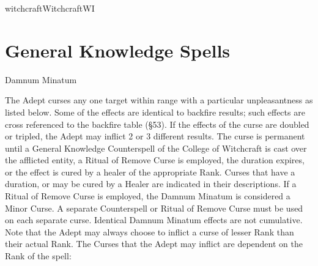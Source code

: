 \begin{College}[1.1]{witchcraft}{Witchcraft}{WI}
\section{General Knowledge Spells}

\begin{spell}[G-1]{Damnum Minatum}

\begin{effects}
The Adept curses any one target within range with a particular
unpleasantness as listed below. Some of the effects are identical to
backfire results; such effects are cross referenced to the backfire
table (§53).  If the effects of the curse are doubled or tripled, the
Adept may inflict 2 or 3 different results.  The curse is permanent
until a General Knowledge Counterspell of the College of Witchcraft is
cast over the afflicted entity, a Ritual of Remove Curse is employed,
the duration expires, or the effect is cured by a healer of the
appropriate Rank. Curses that have a duration, or may be cured by a
Healer are indicated in their descriptions. If a Ritual of Remove
Curse is employed, the Damnum Minatum is considered a Minor Curse.  A
separate Counterspell or Ritual of Remove Curse must be used on each
separate curse.  Identical Damnum Minatum effects are not cumulative.
Note that the Adept may always choose to inflict a curse of lesser
Rank than their actual Rank.  The Curses that the Adept may inflict
are dependent on the Rank of the spell:


\end{effects}
\end{spell}
\end{College}
